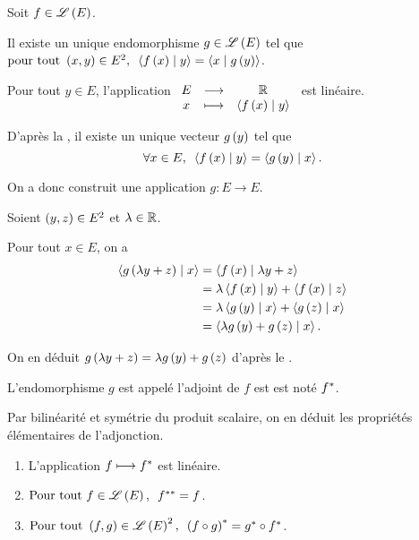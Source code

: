 \begin{prop}
Soit \(f\in\mathscr{L}\left(E\right)\).

Il existe un unique endomorphisme \(g\in\mathscr{L}\left(E\right)\) tel que \(\quantifs{\tpt\paren{x,y}\in E^2}\ps{f\paren{x}}{y}=\ps{x}{g\paren{y}}\).
\end{prop}

\begin{dem}
Pour tout \(y\in E\), l'application \(\fonctionlambda{E}{\R}{x}{\ps{f\paren{x}}{y}}\) est linéaire.

D'après la , il existe un unique vecteur \(g\left(y\right)\) tel que \[\quantifs{\forall x\in E}\ps{f\paren{x}}{y}=\ps{g\paren{y}}{x}.\]

On a donc construit une application \(g:E\to E\).

Soient \(\left(y,z\right)\in E^2\) et \(\lambda\in\mathbb{R}\).

Pour tout \(x\in E\), on a \[\begin{aligned}
\ps{g\paren{\lambda y+z}}{x}&=\ps{f\paren{x}}{\lambda y+z} \\
&=\lambda\ps{f\paren{x}}{y}+\ps{f\paren{x}}{z} \\
&=\lambda\ps{g\paren{y}}{x}+\ps{g\paren{z}}{x} \\
&=\ps{\lambda g\paren{y}+g\paren{z}}{x}.
\end{aligned}\]

On en déduit \(g\left(\lambda y+z\right)=\lambda g\left(y\right)+g\left(z\right)\) d'après le .
\end{dem}

\begin{defi}
L'endomorphisme \(g\) est appelé l'adjoint de \(f\) est est noté \(f^*\).
\end{defi}

Par bilinéarité et symétrie du produit scalaire, on en déduit les propriétés élémentaires de l'adjonction.

\begin{prop}
\begin{enumerate}
    \item L'application \(f\longmapsto f^*\) est linéaire. \\
    \item \(\quantifs{\Tpt f\in\Lendo{E}}f\adjadj=f\). \\
    \item \(\quantifs{\Tpt\paren{f,g}\in\Lendo{E}^2}\paren{f\rond g}\adj=g\adj\rond f\adj\).
\end{enumerate}
\end{prop}

